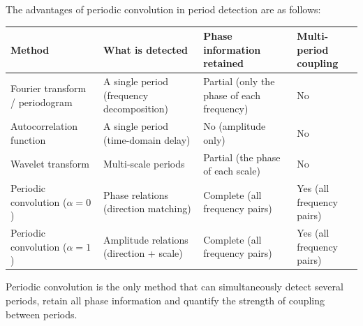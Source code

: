 \begin{proposition}\label{prop:periodic_transform_vs_classical}
The advantages of periodic convolution in period detection are as follows:
\begin{center}
\begin{tabular}{>{\centering\arraybackslash}p{3.2cm}>{\centering\arraybackslash}p{2.8cm}>{\centering\arraybackslash}p{2.8cm}>{\centering\arraybackslash}p{2.7cm}}
\toprule
Method & What is detected & Phase information retained & Multi-period coupling \\
\midrule
Fourier transform / periodogram & A single period (frequency decomposition) & Partial (only the phase of each frequency) & No \\
Autocorrelation function & A single period (time-domain delay) & No (amplitude only) & No \\
Wavelet transform & Multi-scale periods & Partial (the phase of each scale) & No \\
Periodic convolution ($\alpha=0$) & Phase relations (direction matching) & Complete (all frequency pairs) & Yes (all frequency pairs) \\
Periodic convolution ($\alpha=1$) & Amplitude relations (direction + scale) & Complete (all frequency pairs) & Yes (all frequency pairs) \\
\bottomrule
\end{tabular}
\end{center}
Periodic convolution is the only method that can simultaneously detect several periods, retain all phase information and quantify the strength of coupling between periods.
\end{proposition}

